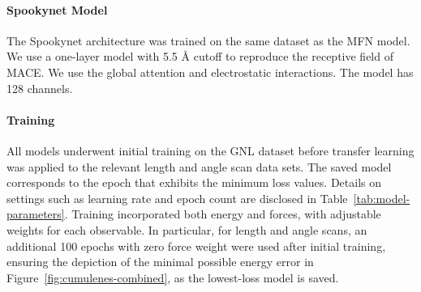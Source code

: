 \documentclass{article} \usepackage{iclr2024_conference,times}
\begin{document}
\paragraph{Spookynet Model}

The Spookynet architecture was trained on the same dataset as the MFN model. We use a one-layer model with 5.5 \r{A} cutoff to reproduce the receptive field of MACE. We use the global attention and electrostatic interactions. The model has 128 channels.

\paragraph{Training}
All models underwent initial training on the GNL dataset before transfer learning was applied to the relevant length and angle scan data sets. The saved model corresponds to the epoch that exhibits the minimum loss values. Details on settings such as learning rate and epoch count are disclosed in Table~\ref{tab:model-parameters}. Training incorporated both energy and forces, with adjustable weights for each observable. In particular, for length and angle scans, an additional 100 epochs with zero force weight were used after initial training, ensuring the depiction of the minimal possible energy error in Figure~\ref{fig:cumulenes-combined}, as the lowest-loss model is saved.


\begin{table}[h]
    \centering
    \caption{Model training parameters. For the matrix functions the number of poles () and matrix channels () are indicated. }
    \label{tab:model-parameters}
\end{table}
\end{document}
